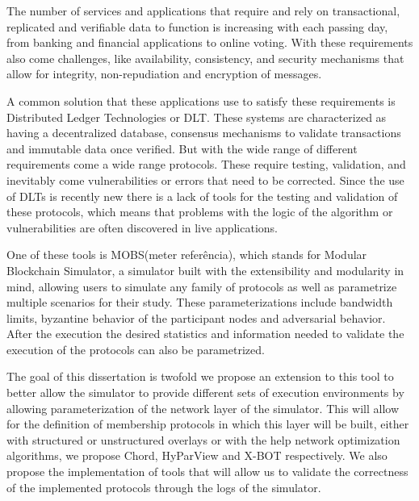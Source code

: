 
%

The number of services and applications that require and rely on transactional, replicated and verifiable data to 
function is increasing with each passing day, from banking and financial applications to online voting. With these
requirements also come challenges, like availability, consistency, and security mechanisms that allow for integrity, non-repudiation and
encryption of messages.

A common solution that these applications use to satisfy these requirements is Distributed Ledger Technologies 
or DLT. These systems are characterized as having a decentralized database, consensus mechanisms 
to validate transactions and immutable data once verified. But with the wide range of different requirements come a wide range protocols.
These require testing, validation, and inevitably come vulnerabilities or errors that need to be corrected.
Since the use of DLTs is recently new there is a lack of tools for the testing and
validation of these protocols, which means that problems with the logic of the algorithm or vulnerabilities are often discovered in live
applications.

One of these tools is MOBS(meter referência), which stands for Modular Blockchain Simulator, a simulator built with the extensibility and
modularity in mind, allowing users to simulate any family of protocols as well as parametrize multiple scenarios for their study.
These parameterizations include bandwidth limits, byzantine behavior of the participant nodes and adversarial behavior. After the execution
the desired statistics and information needed to validate the execution of the protocols can also be parametrized.

The goal of this dissertation is twofold we propose an extension to this tool to better allow the simulator to provide different sets of execution environments by
allowing parameterization of the network layer of the simulator. This will allow for the definition of membership protocols in which this 
layer will be built, either with structured or unstructured overlays or with the help network optimization algorithms, we propose Chord,
HyParView and X-BOT respectively. We also propose the implementation of tools that will allow us to validate the correctness of the
implemented protocols through the logs of the simulator.

